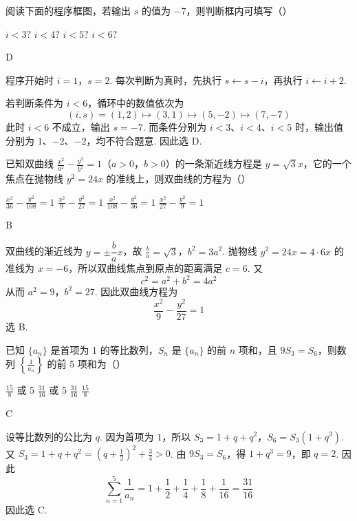 \begin{problem}
阅读下面的程序框图，若输出 \(s\) 的值为 \(-7\)，则判断框内可填写（\quad）


\choices
    {\(i < 3?\)}
    {\(i < 4?\)}
    {\(i < 5?\)}
    {\(i < 6?\)}
\begin{answer}
D
\end{answer}
\begin{solution}
程序开始时 \(i=1\)，\(s=2\). 每次判断为真时，先执行 \(s\leftarrow s-i\)，再执行 \(i\leftarrow i+2\).

若判断条件为 \(i<6\)，循环中的数值依次为
\[
(i,s)=(1,2)\longmapsto(3,1)\longmapsto(5,-2)\longmapsto(7,-7)
\]
此时 \(i<6\) 不成立，输出 \(s=-7\). 而条件分别为 \(i<3\)、\(i<4\)、\(i<5\) 时，输出值分别为 \(1\)、\(-2\)、\(-2\)，均不符合题意. 因此选 D.
\end{solution}
\end{problem}

\begin{problem}
已知双曲线 \(\frac{x^2}{a^2} - \frac{y^2}{b^2} = 1\)（\(a > 0\)，\(b > 0\)）的一条渐近线方程是 \(y = \sqrt{3} x\)，它的一个焦点在抛物线 \(y^2 = 24x\) 的准线上，则双曲线的方程为（\quad）

\choices
    {\(\frac{x^2}{36} - \frac{y^2}{108} = 1\)}
    {\(\frac{x^2}{9} - \frac{y^2}{27} = 1\)}
    {\(\frac{x^2}{108} - \frac{y^2}{36} = 1\)}
    {\(\frac{x^2}{27} - \frac{y^2}{9} = 1\)}
\begin{answer}
B
\end{answer}
\begin{solution}
双曲线的渐近线为 \(y=\pm\dfrac ba x\)，故
\(\frac ba=\sqrt3\)，\(b^2=3a^2\).
抛物线 \(y^2=24x=4\cdot6x\) 的准线为 \(x=-6\)，所以双曲线焦点到原点的距离满足 \(c=6\). 又
\[
c^2=a^2+b^2=4a^2
\]
从而 \(a^2=9\)，\(b^2=27\). 因此双曲线方程为
\[
\frac{x^2}{9}-\frac{y^2}{27}=1
\]
选 B.
\end{solution}
\end{problem}

\begin{problem}
已知 \(\{a_{n}\}\) 是首项为 1 的等比数列，\(S_{n}\) 是 \(\{a_{n}\}\) 的前 \(n\) 项和，且 \(9S_{3} = S_{6}\)，则数列 \(\left\{\frac{1}{a_{n}}\right\}\) 的前 5 项和为（\quad）

\choices
    {\(\frac{15}{8}\) 或 5}
    {\(\frac{31}{16}\) 或 5}
    {\(\frac{31}{16}\)}
    {\(\frac{15}{8}\)}
\begin{answer}
C
\end{answer}
\begin{solution}
设等比数列的公比为 \(q\). 因为首项为 \(1\)，所以
\(S_3=1+q+q^2\)，\(S_6=S_3(1+q^3)\).
又 \(S_3=1+q+q^2=\left(q+\frac12\right)^2+\frac34>0\). 由 \(9S_3=S_6\)，得 \(1+q^3=9\)，即 \(q=2\). 因此
\[
\sum_{n=1}^{5}\frac1{a_n}
=1+\frac12+\frac14+\frac18+\frac1{16}
=\frac{31}{16}
\]
因此选 C.
\end{solution}
\end{problem}

